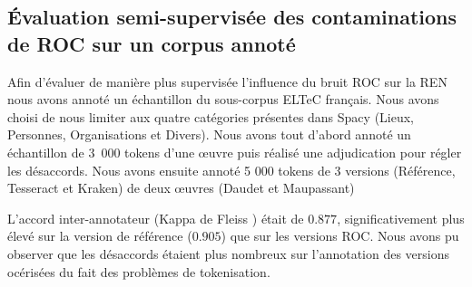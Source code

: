 %    
%



\subsection{\'Evaluation semi-supervisée des contaminations de ROC sur un corpus annoté}

Afin d'évaluer de manière plus supervisée l'influence du bruit ROC sur la REN nous avons annoté un échantillon du sous-corpus ELTeC français.
 Nous avons choisi de nous limiter aux quatre catégories présentes dans Spacy (Lieux, Personnes, Organisations et Divers).
  Nous avons tout d'abord annoté un échantillon de 3~000 tokens d'une œuvre  puis réalisé une adjudication pour régler les désaccords. 
  Nous avons ensuite annoté 5 000 tokens de 3 versions (Référence, Tesseract et Kraken) de deux œuvres (Daudet et Maupassant)

L'accord inter-annotateur (Kappa de  Fleiss \cite{fleiss2013statistical}) était de $0.877$, significativement plus élevé sur la version de référence ($0.905$) que sur les versions ROC. Nous avons pu observer que les désaccords étaient plus nombreux sur l'annotation des versions océrisées du fait des problèmes de tokenisation.

